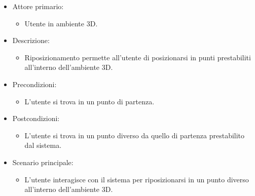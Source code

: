 \begin{itemize}

	\item Attore primario: 
	\begin{itemize}
		\item Utente in ambiente 3D.
	\end{itemize}
	\item Descrizione:
	\begin{itemize}
		\item Riposizionamento permette all'utente di posizionarsi in punti prestabiliti all'interno dell'ambiente 3D.
	\end{itemize}
	
	\item Precondizioni:
	\begin{itemize}
		\item L'utente si trova in un punto di partenza.
	\end{itemize}
	
	\item Postcondizioni:
	\begin{itemize}
		\item L'utente si trova in un punto diverso da quello di partenza prestabilito dal sistema.
	\end{itemize}
	
	\item Scenario principale:
	\begin{itemize}
		\item L'utente interagisce con il sistema per riposizionarsi in un punto diverso all'interno dell'ambiente 3D.
	\end{itemize}
	
\end{itemize}

